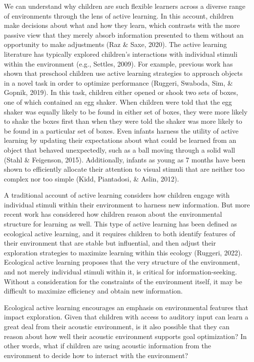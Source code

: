 \documentclass[10pt, letterpaper]{article}
\begin{document}
We can understand why children are such flexible learners across a
diverse range of environments through the lens of active learning. In
this account, children make decisions about what and how they learn,
which contrasts with the more passive view that they merely absorb
information presented to them without an opportunity to make adjustments
(Raz \& Saxe, 2020). The active learning literature has typically
explored children's interactions with individual stimuli within the
environment (e.g., Settles, 2009). For example, previous work has shown
that preschool children use active learning strategies to approach
objects in a novel task in order to optimize performance (Ruggeri,
Swaboda, Sim, \& Gopnik, 2019). In this task, children either opened or
shook two sets of boxes, one of which contained an egg shaker. When
children were told that the egg shaker was equally likely to be found in
either set of boxes, they were more likely to shake the boxes first than
when they were told the shaker was more likely to be found in a
particular set of boxes. Even infants harness the utility of active
learning by updating their expectations about what could be learned from
an object that behaved unexpectedly, such as a ball moving through a
solid wall (Stahl \& Feigenson, 2015). Additionally, infants as young as
7 months have been shown to efficiently allocate their attention to
visual stimuli that are neither too complex nor too simple (Kidd,
Piantadosi, \& Aslin, 2012).

A traditional account of active learning considers how children engage
with individual stimuli within their environment to harness new
information. But more recent work has considered how children reason
about the environmental structure for learning as well. This type of
active learning has been defined as ecological active learning, and it
requires children to both identify features of their environment that
are stable but influential, and then adjust their exploration strategies
to maximize learning within this ecology (Ruggeri, 2022). Ecological
active learning proposes that the very structure of the environment, and
not merely individual stimuli within it, is critical for
information-seeking. Without a consideration for the constraints of the
environment itself, it may be difficult to maximize efficiency and
obtain new information.

Ecological active learning encourages an emphasis on environmental
features that impact exploration. Given that children with access to
auditory input can learn a great deal from their acoustic environment,
is it also possible that they can reason about how well their acoustic
environment supports goal optimization? In other words, what if children
are using acoustic information from the environment to decide how to
interact with the environment?
\end{document}
